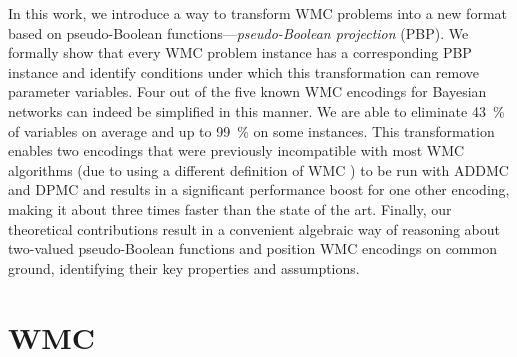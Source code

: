 In this work, we introduce a way to transform WMC problems into a new format
based on pseudo-Boolean functions---\emph{pseudo-Boolean projection} (PBP). We
formally show that every WMC problem instance has a corresponding PBP instance
and identify conditions under which this transformation can remove parameter
variables. Four out of the five known WMC encodings for Bayesian networks
\citep{DBLP:conf/ecai/BartKLM16,DBLP:conf/ijcai/ChaviraD05,DBLP:conf/sat/ChaviraD06,DBLP:conf/kr/Darwiche02,DBLP:conf/aaai/SangBK05}
can indeed be simplified in this manner. We are able to eliminate
\SI{43}{\percent} of variables on average and up to \SI{99}{\percent} on some
instances. This transformation enables two encodings that were previously
incompatible with most WMC algorithms (due to using a different definition of
WMC \citep{DBLP:conf/ijcai/ChaviraD05,DBLP:conf/sat/ChaviraD06}) to be run with
\textsc{ADDMC} and \textsc{DPMC} and results in a significant performance boost
for one other encoding, making it about three times faster than the state of the
art. Finally, our theoretical contributions result in a convenient algebraic way
of reasoning about two-valued pseudo-Boolean functions and position WMC
encodings on common ground, identifying their key properties and assumptions.



\section{WMC}


